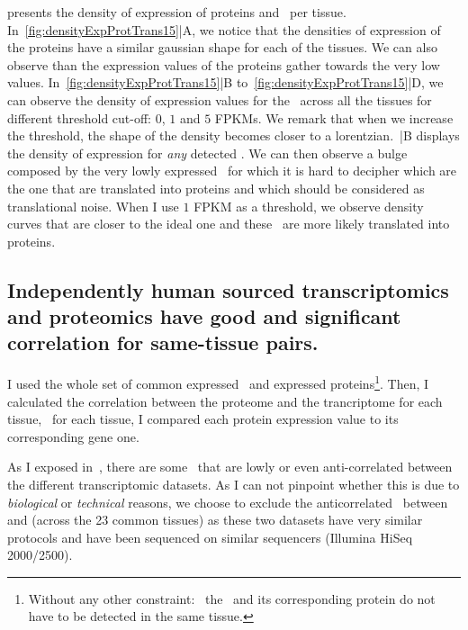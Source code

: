  presents the density of expression
of proteins and \mRNAs\ per tissue. In~\cref{fig:densityExpProtTrans15}|A,
we notice that the densities of expression of the proteins have a similar gaussian
shape for each of the tissues. We can also observe than the expression values
of the proteins gather towards the very low values.
In~\cref{fig:densityExpProtTrans15}|B to~\cref{fig:densityExpProtTrans15}|D,
we can observe the density of expression values for
the \mRNAs\ across all the tissues for
different threshold cut-off: $0$, $1$ and $5$ \glspl{FPKM}.
We remark that when we increase the threshold, the shape
of the density becomes closer to a lorentzian.~|B
displays the density of expression for \emph{any} detected \mRNA\@. We can
then observe a bulge composed by the very lowly expressed \mRNAs\, for which it
is hard to decipher which are the one that are translated into proteins and which
should be considered as translational noise. When I use $1$ \gls{FPKM} as a threshold,
we observe density curves that are closer to the ideal one and these \mRNAs\ are
more likely translated into proteins.


\subsection{Independently human sourced transcriptomics and proteomics
have good and significant correlation for same-tissue pairs.}
\label{subsec:IntegrationGoodCorrProtTrans}

I used the whole set of common expressed \mRNAs\ and
expressed proteins\footnote{Without any other constraint: \eg\ the \mRNA\ and
its corresponding protein do not have to be detected in the same tissue.}.
Then, I calculated the correlation between the proteome and the trancriptome for
each tissue, \ie\ for each tissue, I compared each protein expression value to
its corresponding gene one.

As I exposed in~, there are some
\mRNAs\ that are lowly or even anti-correlated between the different
transcriptomic datasets.
As I can not pinpoint whether this is due to \emph{biological} or \emph{technical}
reasons, we choose to exclude the anticorrelated \mRNAs\ between  and  (across the 23 common tissues) as these two datasets have
very similar protocols and have been sequenced on similar sequencers (Illumina
HiSeq 2000/2500).


